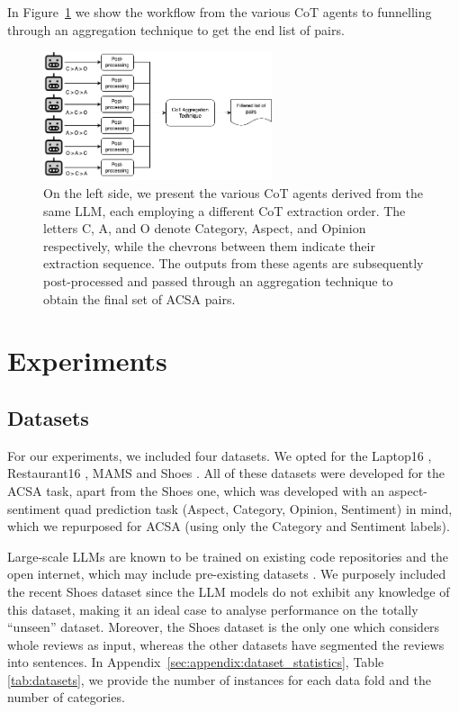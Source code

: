 \documentclass[11pt]{article}
\begin{document}
In Figure~\ref{fig:workflow} we show the workflow from the various CoT agents to funnelling through an aggregation technique to get the end list of pairs.

\begin{figure}[h]
\centering
    \includegraphics[width=0.6\textwidth]{figures/workfllow_absa_cot.png}
    \caption{On the left side, we present the various CoT agents derived from the same LLM, each employing a different CoT extraction order. The letters C, A, and O denote Category, Aspect, and Opinion respectively, while the chevrons between them indicate their extraction sequence. The outputs from these agents are subsequently post-processed and passed through an aggregation technique to obtain the final set of ACSA pairs.}
    \label{fig:workflow}
\end{figure}


\section{Experiments}
\subsection{Datasets}

For our experiments, we included four datasets. We opted for the Laptop16 \citep{pontiki-etal-2016-semeval}, Restaurant16 \citep{pontiki-etal-2016-semeval}, MAMS \citep{jiang-etal-2019-challenge} and Shoes \citep{peper-etal-2024-shoes}. All of these datasets were developed for the ACSA task, apart from the Shoes one, which was developed with an aspect-sentiment quad prediction task (Aspect, Category, Opinion, Sentiment) in mind, which we repurposed for ACSA (using only the Category and Sentiment labels). 

Large-scale LLMs are known to be trained on existing code repositories and the open internet, which may include pre-existing datasets \citep{samuel-etal-2025-towards}. We purposely included the recent Shoes dataset since the LLM models do not exhibit any knowledge of this dataset, making it an ideal case to analyse performance on the totally ``unseen'' dataset. Moreover, the Shoes dataset is the only one which considers whole reviews as input, whereas the other datasets have segmented the reviews into sentences. In Appendix~\ref{sec:appendix:dataset_statistics}, Table \ref{tab:datasets}, we provide the number of instances for each data fold and the number of categories.
\end{document}
